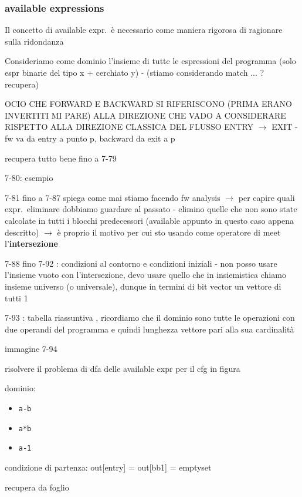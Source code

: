 \subsubsection{available expressions}

Il concetto di available expr.~\`e necessario come maniera rigorosa di ragionare sulla ridondanza

Consideriamo come dominio l'insieme di tutte le espressioni del programma (solo espr binarie del tipo x + cerchiato y) - (stiamo considerando match ... ? recupera)

OCIO CHE FORWARD E BACKWARD SI RIFERISCONO (PRIMA ERANO INVERTITI MI PARE) ALLA DIREZIONE CHE VADO A CONSIDERARE RISPETTO ALLA DIREZIONE CLASSICA DEL FLUSSO ENTRY $\rightarrow$ EXIT - fw va da entry a punto p, backward da exit a p

recupera tutto bene fino a 7-79

7-80: esempio 

7-81 fino a 7-87 spiega come mai stiamo facendo fw analysis $\rightarrow$ per capire quali expr.~eliminare dobbiamo guardare al passato - elimino quelle che non sono state calcolate in tutti i blocchi predecessori (available appunto in questo caso appena descritto) $\rightarrow$ \`e proprio il motivo per cui sto usando come operatore di meet l'\textbf{intersezione}

7-88 fino 7-92 : condizioni al contorno e condizioni iniziali - non posso usare l'insieme vuoto con l'intersezione, devo usare quello che in insiemistica chiamo insieme universo (o universale), dunque in termini di bit vector un vettore di tutti 1

7-93 : tabella riassuntiva , ricordiamo che il dominio sono tutte le operazioni con due operandi del programma e quindi lunghezza vettore pari alla sua cardinalit\`a

\begin{example}
    immagine 7-94

    risolvere il problema di dfa delle available expr per il cfg in figura

    dominio:
    \begin{itemize}
      \item \lstinline|a-b|
      \item \lstinline|a*b|
      \item \lstinline|a-1|
    \end{itemize}
    
    condizione di partenza: out[entry] = out[bb1] = emptyset

    recupera da foglio

\end{example}

